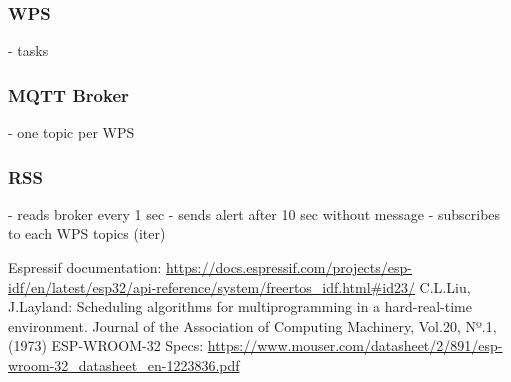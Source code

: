 \documentclass[11pt]{article}
\begin{document}
\subsubsection{WPS}

- tasks

\subsubsection{MQTT Broker}

- one topic per WPS

\subsubsection{RSS}

- reads broker every 1 sec
- sends alert after 10 sec without message
- subscribes to each WPS topics (iter)


\newpage
\begin{thebibliography}{8}

 Espressif documentation: {\url{https://docs.espressif.com/projects/esp-idf/en/latest/esp32/api-reference/system/freertos_idf.html#id23/}}
  C.L.Liu, J.Layland: Scheduling algorithms for multiprogramming in a hard-real-time environment. Journal of the Association of Computing Machinery, Vol.20, Nº.1, (1973)
 ESP-WROOM-32 Specs:  {\url{https://www.mouser.com/datasheet/2/891/esp-wroom-32_datasheet_en-1223836.pdf}}

\end{thebibliography}
\end{document}
